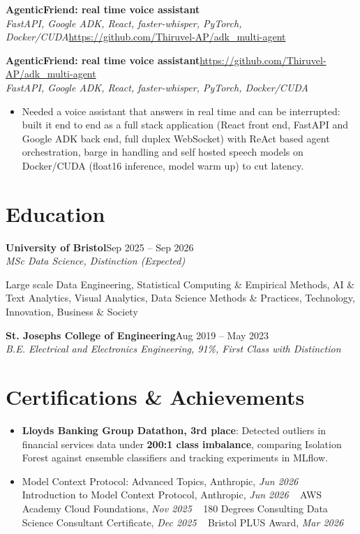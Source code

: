 \documentclass[a4paper,11pt]{article}
\newcommand{\roleNoLoc}[3]{\textbf{#1}\hfill{\color{muted}#2}\\ \textit{#3}\par}
\newcommand{\project}[3]{%
  \textbf{#1}\hfill#3\\ {\color{muted}\small\textit{#2}}\par}
\newcommand{\gap}{\vspace{5pt}}
\newcommand{\num}[1]{\textbf{#1}}   %
\begin{document}
\else
\textbf{AgenticFriend: real time voice assistant}\\ {\color{muted}\small\textit{FastAPI, Google ADK, React, faster-whisper, PyTorch, Docker/CUDA}}\hfill{\small\url{https://github.com/Thiruvel-AP/adk_multi-agent}}\par
\fi
\else
\project{AgenticFriend: real time voice assistant}{FastAPI, Google ADK, React, faster-whisper, PyTorch, Docker/CUDA}{\url{https://github.com/Thiruvel-AP/adk_multi-agent}}
\fi
\begin{itemize}
  \item Needed a voice assistant that answers in real time and can be interrupted: built it end to end as a full stack application (React front end, FastAPI and Google ADK back end, full duplex WebSocket) with ReAct based agent orchestration, barge in handling and self hosted speech models on Docker/CUDA (float16 inference, model warm up) to cut latency.
\end{itemize}

\section{Education}
\roleNoLoc{University of Bristol}{Sep 2025 – Sep 2026}{MSc Data Science, Distinction \textit{(Expected)}}
{\color{muted}\small Large scale Data Engineering, Statistical Computing \& Empirical Methods, AI \& Text Analytics, Visual Analytics, Data Science Methods \& Practices, Technology, Innovation, Business \& Society}\par
\gap
{}
\roleNoLoc{St. Joseph\textquotesingle{}s College of Engineering}{Aug 2019 – May 2023}{B.E. Electrical and Electronics Engineering, 91\%, First Class with Distinction}

\section{Certifications \& Achievements}
\begin{itemize}
  \item \textbf{Lloyd\textquotesingle{}s Banking Group Datathon, 3rd place}: Detected outliers in financial services data under \num{200:1 class imbalance}, comparing Isolation Forest against ensemble classifiers and tracking experiments in MLflow.
  \item Model Context Protocol: Advanced Topics, Anthropic, \textit{Jun 2026}\nobreak\ \,\textperiodcentered\, Introduction to Model Context Protocol, Anthropic, \textit{Jun 2026}\nobreak\ \,\textperiodcentered\, AWS Academy Cloud Foundations, \textit{Nov 2025}\nobreak\ \,\textperiodcentered\, 180 Degrees Consulting Data Science Consultant Certificate, \textit{Dec 2025}\nobreak\ \,\textperiodcentered\, Bristol PLUS Award, \textit{Mar 2026}
\end{itemize}
\end{document}
